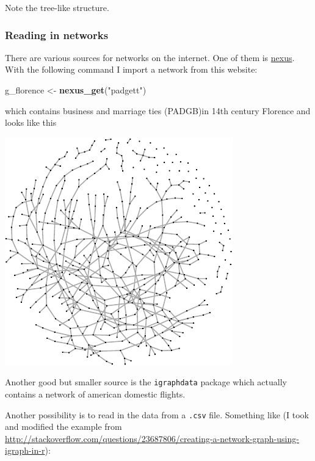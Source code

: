 \documentclass[]{article}
\newenvironment{Shaded}{\begin{snugshade}}{\end{snugshade}}
\newcommand{\KeywordTok}[1]{\textcolor[rgb]{0.13,0.29,0.53}{\textbf{{#1}}}}
\newcommand{\StringTok}[1]{\textcolor[rgb]{0.31,0.60,0.02}{{#1}}}
\newcommand{\NormalTok}[1]{{#1}}
\begin{document}
Note the tree-like structure.

\subsubsection{Reading in networks}\label{reading-in-networks}

There are various sources for networks on the internet. One of them is
\href{http://nexus.igraph.org/}{nexus}. With the following command I
import a network from this website:

\begin{Shaded}
\begin{Highlighting}[]
\NormalTok{g_florence <-}\StringTok{ }\KeywordTok{nexus_get}\NormalTok{(}\StringTok{"padgett"}\NormalTok{)}
\end{Highlighting}
\end{Shaded}

which contains business and marriage ties (PADGB)in 14th century
Florence and looks like this

\begin{Shaded}
\end{Shaded}

\includegraphics{ResearchTools_files/figure-latex/unnamed-chunk-55-1.pdf}

Another good but smaller source is the \texttt{igraphdata} package which
actually contains a network of american domestic flights.

Another possibility is to read in the data from a \texttt{.csv} file.
Something like (I took and modified the example from
\url{http://stackoverflow.com/questions/23687806/creating-a-network-graph-using-igraph-in-r}):
\end{document}
